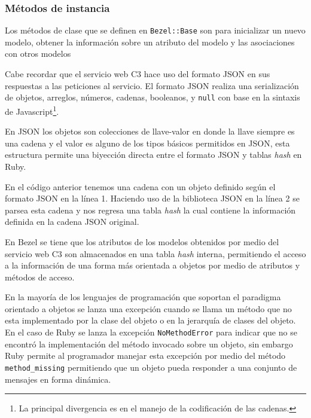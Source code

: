 \subsubsection{Métodos de instancia}

Los métodos de clase que se definen en \texttt{Bezel::Base} son para
inicializar un nuevo modelo, obtener la información sobre un atributo
del modelo y las asociaciones con otros modelos

Cabe recordar que el servicio web C3 hace uso del formato JSON en sus
respuestas a las peticiones al servicio. El formato JSON realiza una serialización
de objetos, arreglos, números, cadenas, booleanos, y \texttt{null} con base en la
sintaxis de Javascript\footnote{La principal divergencia es en el manejo de la
  codificación de las cadenas.}.

En JSON los objetos son colecciones de llave-valor en donde la llave siempre
es una cadena y el valor es alguno de los tipos básicos permitidos en JSON, esta
estructura permite una biyección directa entre el formato JSON y tablas \textit{hash}
en Ruby.



En el código anterior tenemos una cadena con un objeto definido según el formato
JSON en la línea 1. Haciendo uso de la biblioteca JSON en la línea 2 se parsea
esta cadena y nos regresa una tabla \textit{hash} la cual contiene la información
definida en la cadena JSON original.

En Bezel se tiene que los atributos de los modelos obtenidos por medio del servicio
web C3 son almacenados en una tabla \textit{hash} interna, permitiendo el acceso
a la información de una forma más orientada a objetos por medio de atributos
y métodos de acceso.



En la mayoría de los lenguajes de programación que soportan el paradigma orientado
a objetos se lanza una excepción cuando se llama un método que no esta implementado
por la clase del objeto o en la jerarquía de clases del objeto. En el caso de Ruby
se lanza la excepción \texttt{NoMethodError} para indicar que no se encontró la
implementación del método invocado sobre un objeto, sin embargo Ruby permite al
programador manejar esta excepción por medio del método \texttt{method\_missing}
permitiendo que un objeto pueda responder a una conjunto de mensajes en forma
dinámica.

\vspace{2.5mm}


